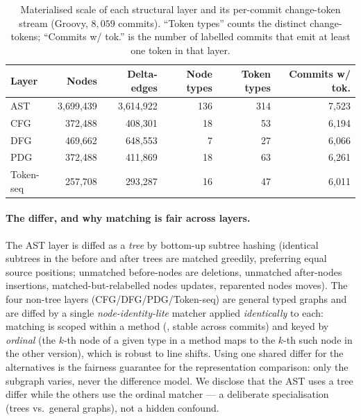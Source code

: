 	\begin{table}[t]
		\centering
		\caption{Materialised scale of each structural layer and its per-commit change-token
			stream (Groovy, $8{,}059$ commits). ``Token types'' counts the distinct
			 change-tokens; ``Commits w/ tok.'' is the number of
			labelled commits that emit at least one token in that layer.}
		\label{tab:setup-layers}
		\begin{tabular}{lrrrrr}
			\toprule
			Layer & Nodes & Delta-edges & Node types & Token types & Commits w/ tok. \\
			\midrule
			AST       & 3{,}699{,}439 & 3{,}614{,}922 & 136 & 314 & 7{,}523 \\
			CFG       &   372{,}488 &   408{,}301 & 18 & 53 & 6{,}194 \\
			DFG       &   469{,}662 &   648{,}553 &  7 & 27 & 6{,}066 \\
			PDG       &   372{,}488 &   411{,}869 & 18 & 63 & 6{,}261 \\
			Token-seq &   257{,}708 &   293{,}287 & 16 & 47 & 6{,}011 \\
			\bottomrule
		\end{tabular}
	\end{table}
	
	\paragraph{The differ, and why matching is fair across layers.} The AST layer is
	diffed as a \emph{tree} by bottom-up subtree hashing (identical subtrees in the before
	and after trees are matched greedily, preferring equal source positions; unmatched
	before-nodes are deletions, unmatched after-nodes insertions, matched-but-relabelled
	nodes updates, reparented nodes moves). The four non-tree layers (CFG/DFG/PDG/Token-seq)
	are general typed graphs and are diffed by a single \emph{node-identity-lite} matcher
	applied \emph{identically} to each: matching is scoped within a method (,
	stable across commits) and keyed by \emph{ordinal} (the $k$-th node of a given type in a
	method maps to the $k$-th such node in the other version), which is robust to line
	shifts. Using one shared differ for the alternatives is the fairness guarantee for the
	representation comparison: only the subgraph varies, never the difference model. We
	disclose that the AST uses a tree differ while the others use the ordinal matcher --- a
	deliberate specialisation (trees vs.\ general graphs), not a hidden confound.
	
